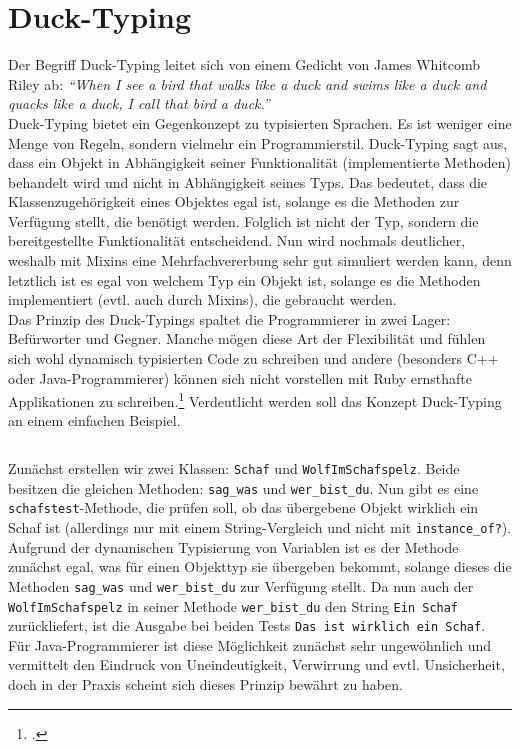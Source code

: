 \documentclass[a4paper, 11pt]{scrreprt}
\begin{document}
\section{Duck-Typing}
Der Begriff Duck-Typing leitet sich von einem Gedicht von James Whitcomb Riley ab: \textit{``When I see a bird that walks like a duck and swims like a duck and quacks like a duck, I call that bird a duck.''}\\
Duck-Typing bietet ein Gegenkonzept zu typisierten Sprachen. Es ist weniger eine Menge von Regeln, sondern vielmehr ein Programmierstil. Duck-Typing sagt aus, dass ein Objekt in Abhängigkeit seiner Funktionalität (implementierte Methoden) behandelt wird und nicht in Abhängigkeit seines Typs. Das bedeutet, dass die Klassenzugehörigkeit eines Objektes egal ist, solange es die Methoden zur Verfügung stellt, die benötigt werden. Folglich ist nicht der Typ, sondern die bereitgestellte Funktionalität entscheidend. Nun wird nochmals deutlicher, weshalb mit Mixins eine Mehrfachvererbung sehr gut simuliert werden kann, denn letztlich ist es egal von welchem Typ ein Objekt ist, solange es die Methoden implementiert (evtl. auch durch Mixins), die gebraucht werden.\\
Das Prinzip des Duck-Typings spaltet die Programmierer in zwei Lager: Befürworter und Gegner. Manche mögen diese Art der Flexibilität und fühlen sich wohl dynamisch typisierten Code zu schreiben und andere (besonders C++ oder Java-Programmierer) können sich nicht vorstellen mit Ruby ernsthafte Applikationen zu schreiben.\footcite[vgl.][S.359-372]{p_ruby}
Verdeutlicht werden soll das Konzept Duck-Typing an einem einfachen Beispiel.
\inputminted[]{ruby}{schaf.rb}
Zunächst erstellen wir zwei Klassen: \texttt{Schaf} und \texttt{WolfImSchafspelz}. Beide besitzen die gleichen Methoden: \texttt{sag\_was} und \texttt{wer\_bist\_du}. Nun gibt es eine \texttt{schafstest}-Methode, die prüfen soll, ob das übergebene Objekt wirklich ein Schaf ist (allerdings nur mit einem String-Vergleich und nicht mit \texttt{instance\_of?}). Aufgrund der dynamischen Typisierung von Variablen ist es der Methode zunächst egal, was für einen Objekttyp sie übergeben bekommt, solange dieses die Methoden \texttt{sag\_was} und \texttt{wer\_bist\_du} zur Verfügung stellt. Da nun auch der \texttt{WolfImSchafspelz} in seiner Methode \texttt{wer\_bist\_du} den String \texttt{Ein Schaf} zurückliefert, ist die Ausgabe bei beiden Tests \texttt{Das ist wirklich ein Schaf}.\\
Für Java-Programmierer ist diese Möglichkeit zunächst sehr ungewöhnlich und vermittelt den Eindruck von Uneindeutigkeit, Verwirrung und evtl. Unsicherheit, doch in der Praxis scheint sich dieses Prinzip bewährt zu haben.
\end{document}
